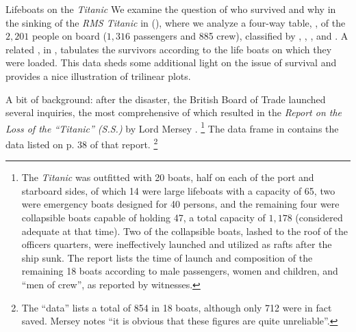 \documentclass[10pt,krantz2]{krantz}\usepackage[]{graphicx}\usepackage[]{color}
\begin{document}
\begin{Example}[lifeboat1]{Lifeboats on the \emph{Titanic}}
We examine the question of who survived and why in the sinking of the \emph{RMS Titanic} in  (),
where we analyze a four-way table, ,
of the $2,201$ people on board ($1,316$ passengers and 885 crew),
classified by , , , and .
A related \Dset,  in , tabulates
the survivors according to the life boats on which they were loaded.
This data sheds some additional light on the issue of survival and
provides a nice illustration of trilinear plots.

A bit of background: after the disaster, the British Board of Trade launched several
inquiries, the most comprehensive of which resulted in the
\emph{Report on the Loss of the ``Titanic'' (S.S.)}
by Lord Mersey
\citep{Mersey:1912}.
\footnote{
The \emph{Titanic} was outfitted with 20 boats, half on each of the
port and starboard sides,
 of which 14 were large
lifeboats with a capacity of 65, two were emergency boats designed for
40 persons, and the remaining four were collapsible boats capable of holding
47, a total capacity of $1,178$ (considered adequate at that time).
Two of the collapsible boats, lashed to the roof of the officers
quarters, were ineffectively launched and utilized as rafts after the ship sunk.
The report lists the time of launch and composition of the remaining 18 boats according to male passengers, women and children, and ``men of crew'',
as reported by witnesses.
}
The  data frame   in 
contains the data listed on p. 38 of that report.%
\footnote{The ``data'' lists a total of 854 in 18 boats, although only
712 were in fact saved.  Mersey notes ``it is obvious that these figures
are quite unreliable''.
}


\end{Example}
\end{document}
